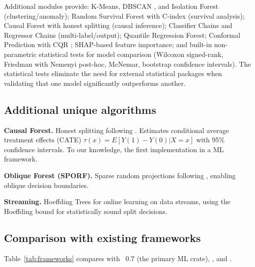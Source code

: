 \documentclass[article]{jss}
\begin{document}
Additional modules provide: K-Means, DBSCAN \citep{Ester+Kriegel+Sander:1996}, and Isolation Forest \citep{Liu+Ting+Zhou:2008} (clustering/anomaly);
Random Survival Forest with C-index \citep{Ishwaran+Kogalur+Blackstone:2008}
(survival analysis); Causal Forest with honest splitting
\citep{Athey+Imbens:2016, Wager+Athey:2018} (causal inference); Classifier Chains
and Regressor Chains (multi-label/output); Quantile Regression Forest; Conformal
Prediction with CQR \citep{Romano+Patterson+Candes:2019}; SHAP-based feature
importance; and built-in non-parametric statistical tests for model comparison
(Wilcoxon signed-rank, Friedman with Nemenyi post-hoc, McNemar, bootstrap
confidence intervals). The statistical tests eliminate the need for external
statistical packages when validating that one model significantly outperforms
another.

\subsection{Additional unique algorithms}

\textbf{Causal Forest.} Honest splitting following
\citet{Athey+Imbens:2016, Wager+Athey:2018}. Estimates conditional average
treatment effects (CATE) $\tau(x) = E[Y(1) - Y(0) | X = x]$ with 95\%
confidence intervals. To our knowledge, the first implementation in a  ML framework.

\textbf{Oblique Forest (SPORF).} Sparse random projections following
\citet{Tomita+Browne+Shen:2020}, enabling oblique decision boundaries.

\textbf{Streaming.} Hoeffding Trees for online learning on data streams,
using the Hoeffding bound for statistically sound split decisions.

\subsection{Comparison with existing frameworks}

Table~\ref{tab:frameworks} compares  with ~0.7
\citep{linfa:2024} (the primary  ML crate), 
\citep{Pedregosa+Varoquaux+Gramfort:2011}, and 
\citep{Lang+Binder+Richter:2019}.
\end{document}
